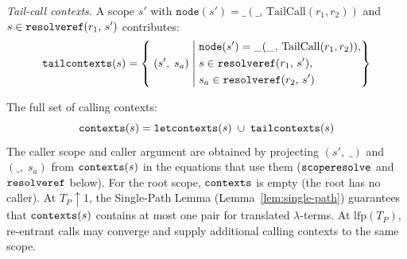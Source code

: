 \emph{Tail-call contexts.}\;
A scope $s'$ with
$\mathtt{node}(s') = \_(\_,\, \mathrm{TailCall}(r_1, r_2))$
and $s \in \mathtt{resolveref}(r_1,\, s')$ contributes:
\begin{equation}\label{eq:lambda-tail-contexts}
  \mathtt{tailcontexts}(s) =
  \left\{\; (s',\; s_a) \;\middle|\;
    \begin{aligned}
      &\mathtt{node}(s') = \_(\_,\, \mathrm{TailCall}(r_1, r_2)),\\
      &s \in \mathtt{resolveref}(r_1,\, s'),\\
      &s_a \in \mathtt{resolveref}(r_2,\, s')
    \end{aligned}
  \right\}
\end{equation}

The full set of calling contexts:
\begin{equation}\label{eq:lambda-contexts}
  \mathtt{contexts}(s) =
  \mathtt{letcontexts}(s) \;\cup\;
  \mathtt{tailcontexts}(s)
\end{equation}
The caller scope and caller argument are obtained by
projecting $(s',\; \_)$ and $(\_,\; s_a)$ from
$\mathtt{contexts}(s)$ in the equations that use them
($\mathtt{scoperesolve}$ and $\mathtt{resolveref}$ below).
For the root scope, $\mathtt{contexts}$ is empty
(the root has no caller).
At $T_P\!\uparrow\!1$, the Single-Path Lemma
(Lemma~\ref{lem:single-path}) guarantees that
$\mathtt{contexts}(s)$ contains at most one pair for
translated $\lambda$-terms.
At $\mathrm{lfp}(T_P)$, re-entrant calls may converge and
supply additional calling contexts to the same scope.

